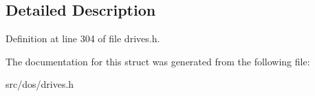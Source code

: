 \subsection{Detailed Description}


Definition at line 304 of file drives.\-h.



The documentation for this struct was generated from the following file\-:\begin{DoxyCompactItemize}
\item 
src/dos/drives.\-h\end{DoxyCompactItemize}
